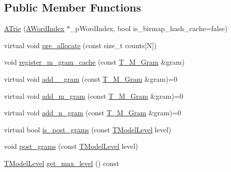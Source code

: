 \subsection*{Public Member Functions}
\begin{DoxyCompactItemize}
\item 
\hyperlink{classuva_1_1smt_1_1tries_1_1_a_trie_adedfb4755e267882e91d9e0db499a1b7}{A\+Trie} (\hyperlink{classuva_1_1smt_1_1tries_1_1dictionary_1_1_a_word_index}{A\+Word\+Index} $\ast$\+\_\+p\+Word\+Index, bool is\+\_\+birmap\+\_\+hash\+\_\+cache=false)
\item 
virtual void \hyperlink{classuva_1_1smt_1_1tries_1_1_a_trie_a4c523028bdf0949d762d1bbfd3fdc262}{pre\+\_\+allocate} (const size\+\_\+t counts\mbox{[}N\mbox{]})
\item 
void \hyperlink{classuva_1_1smt_1_1tries_1_1_a_trie_afe3c10a349785d0401a93de1f46ecb11}{register\+\_\+m\+\_\+gram\+\_\+cache} (const \hyperlink{structuva_1_1smt_1_1tries_1_1mgrams_1_1_t___m___gram}{T\+\_\+\+M\+\_\+\+Gram} \&gram)
\item 
virtual void \hyperlink{classuva_1_1smt_1_1tries_1_1_a_trie_a3ff08588c72cd70dfc3d8129968d57b5}{add\+\_\+\_\+gram} (const \hyperlink{structuva_1_1smt_1_1tries_1_1mgrams_1_1_t___m___gram}{T\+\_\+\+M\+\_\+\+Gram} \&gram)=0
\item 
virtual void \hyperlink{classuva_1_1smt_1_1tries_1_1_a_trie_a469f894057a536141d84be00e8bd8f5f}{add\+\_\+m\+\_\+gram} (const \hyperlink{structuva_1_1smt_1_1tries_1_1mgrams_1_1_t___m___gram}{T\+\_\+\+M\+\_\+\+Gram} \&gram)=0
\item 
virtual void \hyperlink{classuva_1_1smt_1_1tries_1_1_a_trie_aa4598e59915c77e7bf92d744d7d35f02}{add\+\_\+n\+\_\+gram} (const \hyperlink{structuva_1_1smt_1_1tries_1_1mgrams_1_1_t___m___gram}{T\+\_\+\+M\+\_\+\+Gram} \&gram)=0
\item 
virtual bool \hyperlink{classuva_1_1smt_1_1tries_1_1_a_trie_abaa5760dcdd087e3f977eae925862043}{is\+\_\+post\+\_\+grams} (const \hyperlink{namespaceuva_1_1smt_1_1tries_a20577a44b3a42d26524250634379b7cb}{T\+Model\+Level} level)
\item 
void \hyperlink{classuva_1_1smt_1_1tries_1_1_a_trie_a4416bd9ebf793e9d0d0a8ec715d0a3ce}{post\+\_\+grams} (const \hyperlink{namespaceuva_1_1smt_1_1tries_a20577a44b3a42d26524250634379b7cb}{T\+Model\+Level} level)
\item 
\hyperlink{namespaceuva_1_1smt_1_1tries_a20577a44b3a42d26524250634379b7cb}{T\+Model\+Level} \hyperlink{classuva_1_1smt_1_1tries_1_1_a_trie_a192510a887555617e703d03c145bbee5}{get\+\_\+max\+\_\+level} () const 

\end{DoxyCompactItemize}

